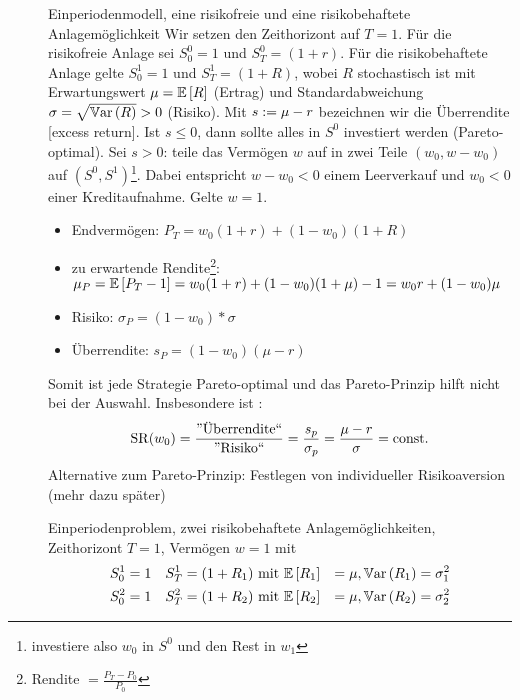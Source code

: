 \begin{description}
	\item[] Einperiodenmodell, eine risikofreie und eine risikobehaftete Anlagemöglichkeit \linebreak
	Wir setzen den Zeithorizont auf $T = 1$. Für die risikofreie Anlage sei $S_0^0 = 1$ und $S_T^0 = (1+r)$. Für die risikobehaftete Anlage gelte $S_0^1 = 1$ und $S_T^1 = (1+R)$, wobei $R$ stochastisch ist mit Erwartungswert $\mu = \EW[R]$ (Ertrag) und Standardabweichung $\sigma = \sqrt{\Var[R]} > 0$ (Risiko).
	Mit $s \defeq \mu  - r$ bezeichnen wir die Überrendite [excess return]. Ist $s \le 0$, dann sollte alles in $S^0$ investiert werden (Pareto-optimal). Sei $s > 0$: teile das Vermögen $w$ auf in zwei Teile $(w_0, w - w_0)$ auf $(S^0, S^1)$\footnote{investiere also $w_0$ in $S^0$ und den Rest in $w_1$}. Dabei entspricht $w - w_0 < 0$ einem Leerverkauf und $w_0 < 0$ einer Kreditaufnahme. Gelte $w=1$. 
	\begin{itemize}[nolistsep]
		\item Endvermögen: $P_T = w_0 (1+r) + (1-w_0) (1+R)$
		\item zu erwartende Rendite\footnote{Rendite $= \frac{P_T - P_0}{P_0}$}: $\mu_P = \EW[P_T - 1] = w_0 (1+r) + (1-w_0)(1+\mu) -1 = w_0 r + (1-w_0) \mu$
		\item Risiko:  $\sigma_P = (1-w_0) * \sigma$
		\item Überrendite: $s_P = (1-w_0) (\mu - r)$
	\end{itemize}
	Somit ist jede Strategie Pareto-optimal und das Pareto-Prinzip hilft nicht bei der Auswahl. Insbesondere ist :
	\begin{equation*}
		\SR(w_0) = \frac{\text{''Überrendite``}}{\text{''Risiko``}} = \frac{s_p}{\sigma_p} = \frac{\mu - r}{\sigma} = \text{const.}
	\end{equation*}
	Alternative zum Pareto-Prinzip: Festlegen von individueller Risikoaversion (mehr dazu später)
	\item[] Einperiodenproblem, zwei risikobehaftete Anlagemöglichkeiten, Zeithorizont $T=1$, Vermögen $w=1$ mit
	\begin{equation*}
		\begin{aligned}
		S_0^1 &= 1 & S_T^1 = (1+R_1) &\mit \EW[R_1] &= \mu, \Var[R_1] = \sigma_1^2 \\
		S_0^2 &= 1 & S_T^2 = (1+R_2) &\mit \EW[R_2] &= \mu, \Var[R_2] = \sigma_2^2
		\end{aligned}
	\end{equation*}

\end{description}
